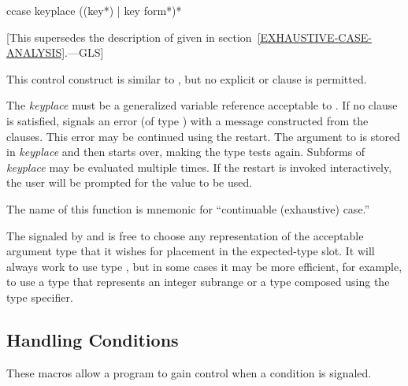 \begin{defmac}
ccase keyplace {({({key}*) | key} {form}*)}*

   [This supersedes the description of 
   given in section~\ref{EXHAUSTIVE-CASE-ANALYSIS}.---GLS]

  This control construct is similar to , but no explicit  or
   clause is permitted.

  The \emph{keyplace} must be a generalized variable reference acceptable to .
  If no clause is satisfied,  signals an error (of type )
  with a message constructed from the clauses. This error may be continued
  using the  restart. The argument to  is stored in
  \emph{keyplace} and then  starts over, making the type tests again. Subforms
  of \emph{keyplace} may be evaluated multiple times. If the  restart is
  invoked interactively, the user will be prompted for the value to be used.

  The name of this function is mnemonic for ``continuable (exhaustive) case.''

\beforenoterule
\begin{implementation}
  The  signaled by  and  is free to
  choose any representation of the acceptable argument type that it wishes
  for placement in the expected-type slot. It will always work to use type
  , but in some cases it may be more efficient, for example,
  to use a type that represents an integer subrange or a type composed using the
   type specifier.
\end{implementation}
\afternoterule
\end{defmac}


\subsection{Handling Conditions}

These macros allow a program to gain control when a condition is signaled.

